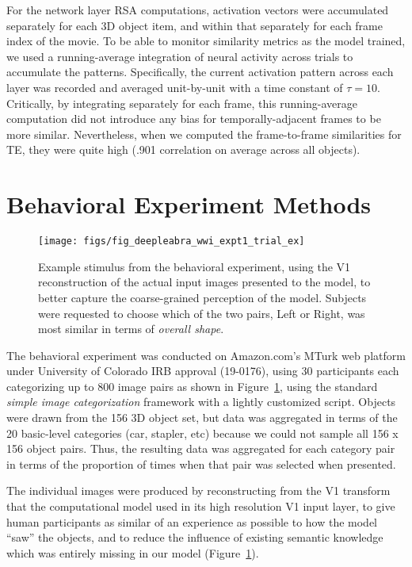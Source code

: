 For the network layer RSA computations, activation vectors were accumulated separately for each 3D object item, and within that separately for each frame index of the movie.  To be able to monitor similarity metrics as the model trained, we used a running-average integration of neural activity across trials to accumulate the patterns.  Specifically, the current activation pattern across each layer was recorded and averaged unit-by-unit with a time constant of $\tau = 10$. Critically, by integrating separately for each frame, this running-average computation did not introduce any bias for temporally-adjacent frames to be more similar.  Nevertheless, when we computed the frame-to-frame similarities for TE, they were quite high (.901 correlation on average across all objects).

\section{Behavioral Experiment Methods}

\begin{figure}
  \centering\texttt{[image: figs/fig\_deepleabra\_wwi\_expt1\_trial\_ex]}
  \caption{\footnotesize Example stimulus from the behavioral experiment, using the V1 reconstruction of the actual input images presented to the model, to better capture the coarse-grained perception of the model.  Subjects were requested to choose which of the two pairs, Left or Right, was most similar in terms of {\em overall shape}.}
  \label{fig.expt}
\end{figure}

The behavioral experiment was conducted on Amazon.com's MTurk web platform under University of Colorado IRB approval (19-0176), using 30 participants each categorizing up to 800 image pairs as shown in Figure~\ref{fig.expt}, using the standard {\em simple image categorization} framework with a lightly customized script.  Objects were drawn from the 156 3D object set, but data was aggregated in terms of the 20 basic-level categories (car, stapler, etc) because we could not sample all 156 x 156 object pairs.  Thus, the resulting data was aggregated for each category pair in terms of the proportion of times when that pair was selected when presented.

The individual images were produced by reconstructing from the V1 transform that the computational model used in its high resolution V1 input layer, to give human participants as similar of an experience as possible to how the model ``saw'' the objects, and to reduce the influence of existing semantic knowledge which was entirely missing in our model (Figure~\ref{fig.expt}).

